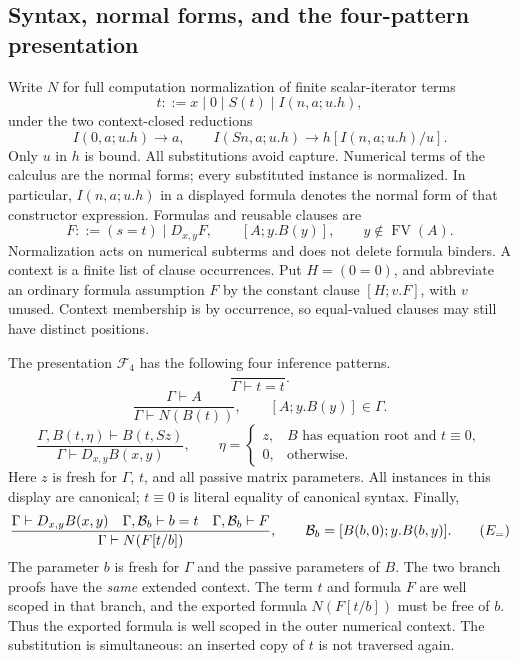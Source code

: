 \documentclass[11pt,letterpaper]{article}
\theoremstyle{definition}\newtheorem{definition}[theorem]{Definition}
\theoremstyle{remark}\newtheorem{remark}[theorem]{Remark}
\begin{document}
\subsection{Syntax, normal forms, and the four-pattern presentation}

Write $N$ for full computation normalization of finite scalar-iterator terms
\[
 t::=x\mid 0\mid S(t)\mid I(n,a;u.h),
\]
under the two context-closed reductions
\[
 I(0,a;u.h)\longrightarrow a,
 \qquad
 I(Sn,a;u.h)\longrightarrow h[I(n,a;u.h)/u].
\]
Only $u$ in $h$ is bound. All substitutions avoid capture. Numerical terms
of the calculus are the normal forms; every substituted instance is normalized.
In particular, $I(n,a;u.h)$ in a displayed formula denotes the normal form of
that constructor expression. Formulas and reusable clauses are
\[
 F::=(s=t)\mid D_{x,y}F,
 \qquad [A;y.B(y)],\qquad y\notin\operatorname{FV}(A).
\]
Normalization acts on numerical subterms and does not delete formula binders.
A context is a finite list of clause occurrences. Put $H=(0=0)$, and abbreviate
an ordinary formula assumption $F$ by the constant clause $[H;v.F]$, with $v$
unused. Context membership is by occurrence, so equal-valued clauses may still
have distinct positions.

The presentation $\mathcal F_4$ has the following four inference patterns.
\[
 \frac{}{\Gamma\vdash t=t}.\tag{R}\label{fus:refl}
\]
\[
 \frac{\Gamma\vdash A}{\Gamma\vdash N(B(t))},
 \qquad [A;y.B(y)]\in\Gamma.\tag{U}\label{fus:use}
\]
\[
 \frac{\Gamma,B(t,\eta)\vdash B(t,Sz)}
      {\Gamma\vdash D_{x,y}B(x,y)},\qquad
 \eta=\begin{cases}
 z,& B\text{ has equation root and }t\equiv0,\\
 0,&\text{otherwise}.
 \end{cases}\tag{I}\label{fus:intro}
\]
Here $z$ is fresh for $\Gamma$, $t$, and all passive matrix parameters. All
instances in this display are canonical; $t\equiv0$ is literal equality of
canonical syntax. Finally,
\[
\frac{
 \Gamma\vdash D_{x,y}B(x,y)
 \quad
 \Gamma,\mathcal B_b\vdash b=t
 \quad
 \Gamma,\mathcal B_b\vdash F
}{
 \Gamma\vdash N(F[t/b])
},
\qquad
 \mathcal B_b=[B(b,0);y.B(b,y)].
\tag{$E_{=}$}\label{fus:elim}
\]
The parameter $b$ is fresh for $\Gamma$ and the passive parameters of $B$.
The two branch proofs have the \emph{same} extended context. The term $t$ and
formula $F$ are well scoped in that branch, and the exported formula
$N(F[t/b])$ must be free of $b$. Thus the exported formula is well scoped in
the outer numerical context. The substitution is simultaneous: an inserted
copy of $t$ is not traversed again.
\end{document}
